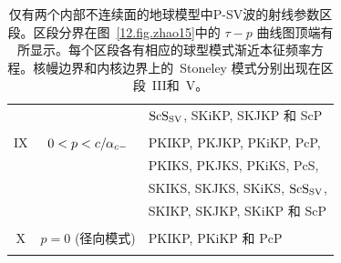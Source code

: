 \begin{table}[!t]
\begin{tabular}{|c|c|l|}
& & ${\rm ScS}_{\rm SV}$, SKiKP, SKJKP 和 ScP \\
& & \\
IX & $0<p<c/\hspace{-0.2 mm}\alpha_{c-}$ & PKIKP, PKJKP, PKiKP, PcP, \\
& &  PKIKS, PKJKS, PKiKS, PcS, \\
& &  SKIKS, SKJKS, SKiKS, ${\rm ScS}_{\rm SV}$, \\
& & SKIKP, SKJKP, SKiKP 和 ScP \\
& & \\
X & $p=0$ (径向模式) & PKIKP, PKiKP 和 PcP \\
& & \\ \hline
\end{tabular}
\caption[SH modes]{仅有两个内部不连续面的地球模型中P-SV波的射线参数区段。区段分界在图~\ref{12.fig.zhao15}中的 $\tau\!-\!p$ 曲线图顶端有所显示。每个区段各有相应的球型模式渐近本征频率方程。核幔边界和内核边界上的~Stoneley 模式分别出现在区段~III和~V。}
\label{table:PSV}
\end{table}

